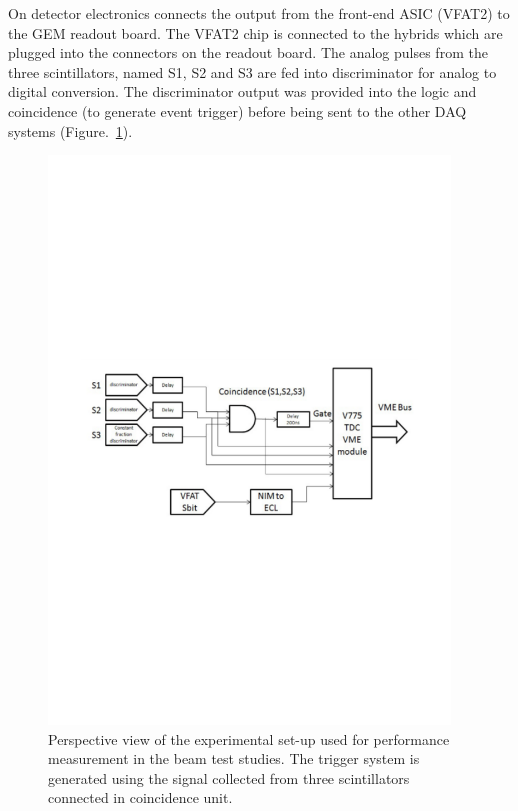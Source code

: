 On detector electronics connects the output from the front-end ASIC (VFAT2) to the GEM readout board.
The VFAT2 chip is connected to the hybrids which are plugged into the connectors on the readout board.
The analog pulses from the three scintillators, named S1, S2 and S3 are fed into discriminator for analog to digital conversion.
The discriminator output was provided into the logic and coincidence (to generate event trigger) before being sent to the other DAQ systems (Figure.~\ref{fig:tbs}).
\begin{figure}[!htbp]
\centering
\includegraphics[width=0.95\textwidth]{figures/GEM/daq.pdf}
\caption{Perspective view of the experimental set-up used for performance measurement in the beam test studies. The trigger system is generated using the signal collected from three scintillators connected in coincidence unit.}\label{fig:tbs}
\end{figure}


